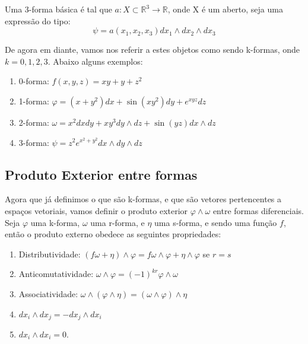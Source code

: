 \hspace{0.5cm}
Uma 3-forma básica é tal que $a:X\subset \mathbb{R}^3 \to \mathbb{R}$, onde X é um aberto, seja uma expressão do tipo:
%
\begin{equation}
\psi = a(x_1,x_2,x_3) dx_1 \wedge dx_2 \wedge dx_3
\end{equation}

De agora em diante, vamos nos referir a estes objetos como sendo 
k-formas, onde $k = 0,1,2,3$. Abaixo alguns exemplos:

\begin{enumerate}
  \item 0-forma: $f(x,y,z) = xy + y + z^2 $
  \item 1-forma: $\varphi = (x + y^2)dx + \sin(xy^2)dy + e^{xyz}dz$
  \item 2-forma: $\omega = x^2dx dy + xy^3 dy \wedge dz + \sin(yz) dx \wedge dz $
  \item 3-forma: $\psi = z^2e^{x^2+y^2} dx \wedge dy \wedge dz $
\end{enumerate}



\subsection{Produto Exterior entre formas}

\hspace{0.5cm}
Agora que já definimos o que são k-formas, e que são vetores 
pertencentes a espaços vetoriais, vamos definir o produto 
exterior $\varphi \wedge \omega$ entre formas diferenciais. Seja $\varphi$ uma k-forma, $\omega$ uma r-forma, e $\eta$ uma s-forma, e sendo uma função $f$, então o produto externo obedece as seguintes propriedades:

\begin{enumerate}
  \item Distributividade: $(f\omega + \eta)\wedge \varphi 
  = f \omega \wedge \varphi + \eta \wedge \varphi$ se $r = s$
  \item Anticomutatividade: $\omega \wedge \varphi 
  = (-1)^{k r} \varphi \wedge \omega$
  \item Associatividade: $\omega \wedge (\varphi \wedge \eta) 
  = (\omega \wedge \varphi) \wedge \eta$
  \item $dx_i \wedge dx_j = - dx_j \wedge dx_i$
  \item $dx_i \wedge dx_i = 0$.
\end{enumerate}


